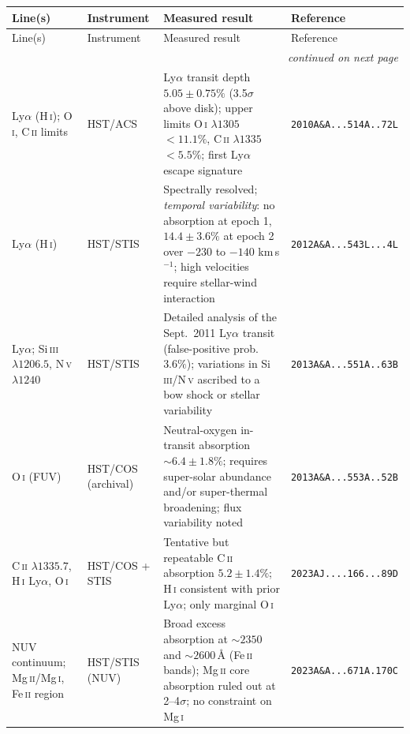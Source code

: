 \begin{longtable}{@{}p{}p{}p{}p{}@{}}
\toprule
Line(s) & Instrument & Measured result & Reference \\
\midrule
\endfirsthead
\toprule
Line(s) & Instrument & Measured result & Reference \\
\midrule
\endhead
\midrule
\multicolumn{4}{r}{\emph{continued on next page}}\\
\endfoot
\bottomrule
\endlastfoot

Ly$\alpha$ (H\,\textsc{i}); O\,\textsc{i}, C\,\textsc{ii} limits &
HST/ACS &
Ly$\alpha$ transit depth $5.05\pm0.75\%$ (3.5$\sigma$ above disk); upper limits O\,\textsc{i} $\lambda1305$ $<11.1\%$, C\,\textsc{ii} $\lambda1335$ $<5.5\%$; first Ly$\alpha$ escape signature &
\texttt{2010A\&A...514A..72L} \\

Ly$\alpha$ (H\,\textsc{i}) &
HST/STIS &
Spectrally resolved; \emph{temporal variability}: no absorption at epoch 1, $14.4\pm3.6\%$ at epoch 2 over $-230$ to $-140$ km\,s$^{-1}$; high velocities require stellar-wind interaction &
\texttt{2012A\&A...543L...4L} \\

Ly$\alpha$; Si\,\textsc{iii} $\lambda1206.5$, N\,\textsc{v} $\lambda1240$ &
HST/STIS &
Detailed analysis of the Sept.\ 2011 Ly$\alpha$ transit (false-positive prob.\ $3.6\%$); variations in Si\,\textsc{iii}/N\,\textsc{v} ascribed to a bow shock or stellar variability &
\texttt{2013A\&A...551A..63B} \\

O\,\textsc{i} (FUV) &
HST/COS (archival) &
Neutral-oxygen in-transit absorption $\sim6.4\pm1.8\%$; requires super-solar abundance and/or super-thermal broadening; flux variability noted &
\texttt{2013A\&A...553A..52B} \\

C\,\textsc{ii} $\lambda1335.7$, H\,\textsc{i} Ly$\alpha$, O\,\textsc{i} &
HST/COS + STIS &
Tentative but repeatable C\,\textsc{ii} absorption $5.2\pm1.4\%$; H\,\textsc{i} consistent with prior Ly$\alpha$; only marginal O\,\textsc{i} &
\texttt{2023AJ....166...89D} \\

NUV continuum; Mg\,\textsc{ii}/Mg\,\textsc{i}, Fe\,\textsc{ii} region &
HST/STIS (NUV) &
Broad excess absorption at $\sim2350$ and $\sim2600$\,\AA{} (Fe\,\textsc{ii} bands); Mg\,\textsc{ii} core absorption ruled out at 2--4$\sigma$; no constraint on Mg\,\textsc{i} &
\texttt{2023A\&A...671A.170C} \\


\end{longtable}
